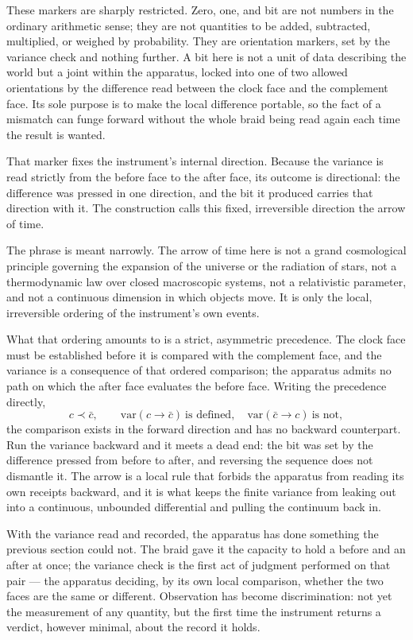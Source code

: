 These markers are sharply restricted. Zero, one, and bit are not numbers in the ordinary arithmetic sense; they are not quantities to be added, subtracted, multiplied, or weighed by probability. They are orientation markers, set by the variance check and nothing further. A bit here is not a unit of data describing the world but a joint within the apparatus, locked into one of two allowed orientations by the difference read between the clock face and the complement face. Its sole purpose is to make the local difference portable, so the fact of a mismatch can funge forward without the whole braid being read again each time the result is wanted.

That marker fixes the instrument's internal direction. Because the variance is read strictly from the before face to the after face, its outcome is directional: the difference was pressed in one direction, and the bit it produced carries that direction with it. The construction calls this fixed, irreversible direction the arrow of time. 

The phrase is meant narrowly. The arrow of time here is not a grand cosmological principle governing the expansion of the universe or the radiation of stars, not a thermodynamic law over closed macroscopic systems, not a relativistic parameter, and not a continuous dimension in which objects move. It is only the local, irreversible ordering of the instrument's own events. 

What that ordering amounts to is a strict, asymmetric precedence. The clock face must be established before it is compared with the complement face, and the variance is a consequence of that ordered comparison; the apparatus admits no path on which the after face evaluates the before face. Writing the precedence directly,
\[ c \prec \bar c, \qquad \mathrm{var}(c \to \bar c)\ \text{is defined}, \quad \mathrm{var}(\bar c \to c)\ \text{is not}, \]
the comparison exists in the forward direction and has no backward counterpart. Run the variance backward and it meets a dead end: the bit was set by the difference pressed from before to after, and reversing the sequence does not dismantle it. The arrow is a local rule that forbids the apparatus from reading its own receipts backward, and it is what keeps the finite variance from leaking out into a continuous, unbounded differential and pulling the continuum back in.

With the variance read and recorded, the apparatus has done something the previous section could not. The braid gave it the capacity to hold a before and an after at once; the variance check is the first act of judgment performed on that pair --- the apparatus deciding, by its own local comparison, whether the two faces are the same or different. Observation has become discrimination: not yet the measurement of any quantity, but the first time the instrument returns a verdict, however minimal, about the record it holds.

